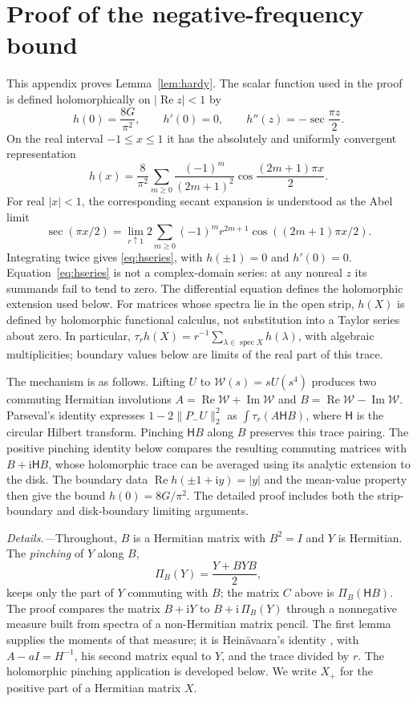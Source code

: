 \documentclass[aps,prl,reprint,superscriptaddress,longbibliography,floatfix,raggedbottom]{revtex4-2}
\newcommand{\ii}{\mathrm i}
\newcommand{\norm}[1]{\lVert #1\rVert}
\newcommand{\abs}[1]{\lvert #1\rvert}
\DeclareMathOperator{\spec}{spec}
\newcommand{\tr}{\tau}
\newcommand{\Hilb}{\mathsf H}
\begin{document}
\appendix

\section{Proof of the negative-frequency bound}\label{app:hardy}

This appendix proves Lemma~\ref{lem:hardy}. The scalar function used in
the proof is defined holomorphically on $\abs{\operatorname{Re}z}<1$ by
\[
h(0)=\frac{8G}{\pi^2},\qquad h'(0)=0,\qquad
h''(z)=-\sec\frac{\pi z}{2}.
\]
On the real interval $-1\le x\le1$ it has the absolutely and uniformly
convergent representation
\begin{equation}\label{eq:hseries}
h(x)=\frac8{\pi^2}\sum_{m\ge0}\frac{(-1)^m}{(2m+1)^2}
\cos\frac{(2m+1)\pi x}{2}.
\end{equation}
For real $|x|<1$, the corresponding secant expansion is understood as
the Abel limit
\[
\sec(\pi x/2)=\lim_{r\uparrow1}2\sum_{m\ge0}(-1)^mr^{2m+1}
\cos((2m+1)\pi x/2).
\]
Integrating twice gives
\eqref{eq:hseries}, with $h(\pm1)=0$ and \mbox{$h'(0)=0$}.
Equation~\eqref{eq:hseries} is not a complex-domain series: at any
nonreal $z$ its summands fail to tend to zero. The differential equation
defines the holomorphic extension used below.
For matrices whose spectra lie in the open strip, $h(X)$ is defined by
holomorphic functional calculus, not substitution into a Taylor series
about zero. In particular,
$\tr_r h(X)=r^{-1}\sum_{\lambda\in\spec X}h(\lambda)$, with algebraic
multiplicities; boundary values below are limits of the real part of
this trace.

The mechanism is as follows. Lifting $U$ to
$\mathcal W(s)=sU(s^4)$ produces two commuting Hermitian involutions
$A=\operatorname{Re}\mathcal W+\operatorname{Im}\mathcal W$ and
$B=\operatorname{Re}\mathcal W-\operatorname{Im}\mathcal W$.
Parseval's identity expresses $1-2\norm{P_-U}_2^2$ as
$\int\tr_r(A\Hilb B)$, where $\Hilb$ is the circular Hilbert transform.
Pinching $\Hilb B$ along $B$ preserves this trace pairing. The positive
pinching identity below compares the resulting commuting matrices with
$B+\ii\Hilb B$, whose holomorphic trace can be averaged using its
analytic extension to the disk. The boundary data
$\operatorname{Re}h(\pm1+\ii y)=|y|$ and the mean-value property then
give the bound $h(0)=8G/\pi^2$. The detailed proof includes both the
strip-boundary and disk-boundary limiting arguments.

\emph{Details.---}Throughout, $B$ is a Hermitian matrix with $B^2=I$
and $Y$ is Hermitian. The \emph{pinching} of $Y$ along $B$,
\[
\Pi_B(Y)=\frac{Y+BYB}2,
\]
keeps only the part of $Y$ commuting with $B$; the matrix $C$ above is
$\Pi_B(\Hilb B)$. The proof compares the
matrix $B+\ii Y$ to $B+\ii\,\Pi_B(Y)$ through a nonnegative measure
built from spectra of a non-Hermitian matrix pencil. The first lemma
supplies the moments of that measure; it is
Hein\"avaara's identity \cite[Eq.~(16), proof of Lemma~2.5]{Heinavaara26},
with $A-aI=H^{-1}$, his second matrix equal to $Y$, and the trace divided
by $r$. The holomorphic pinching application is developed below. We write $X_+$ for the
positive part of a Hermitian matrix $X$.
\end{document}
